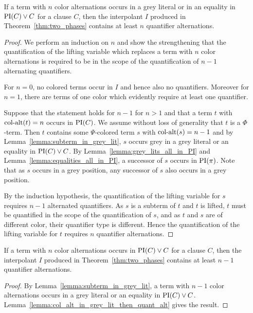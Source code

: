 \documentclass[%
	draft=false,%
	numbers=noendperiod,%
	11pt,%
	a4paper,%
	oneside,%
	openany,%
]{memoir}
\begin{document}
\begin{lemma}
	\label{lemma:col_alt_in_grey_lit_then_quant_alt}
	If a term with $n$ color alternations occurs in a grey literal or in an equality in $\operatorname{PI}(C) \lor C$ for a clause $C$, then the interpolant $I$ produced in Theorem~\ref{thm:two_phases} contains at least $n$ quantifier alternations.
\end{lemma}
\begin{proof}
	We perform an induction on $n$
	and show the strengthening that
	the quantification of the lifting variable which replaces a term with $n$ color alternations is required to be in the scope of the quantification of $n-1$ alternating quantifiers.

	For $n=0$, no colored terms occur in $I$ and hence also no quantifiers.
	Moreover for $n=1$, there are terms of one color which evidently require at least one quantifier.

	Suppose that the statement holds for $n-1$ for $n>1$ and that a term $t$ with $\operatorname{col-alt}(t) = n$ occurs in $\operatorname{PI}(C)$.
	We assume without loss of generality that $t$ is a $\Phi$-term.
	Then $t$ contains some $\Psi$-colored term $s$ with $\operatorname{col-alt}(s) = n-1$ and
	by Lemma~\ref{lemma:subterm_in_grey_lit}, $s$ occurs grey in a grey literal or an equality in $\operatorname{PI}(C) \lor C$.
	By Lemma~\ref{lemma:grey_lits_all_in_PI} and Lemma~\ref{lemma:equalities_all_in_PI}, a successor of $s$ occurs in $\operatorname{PI}(\pi)$. Note that as $s$ occurs in a grey position, any successor of $s$ also occurs in a grey position.

	By the induction hypothesis, the quantification of the lifting variable for $s$ requires $n-1$ alternated quantifiers.
	As $s$ is a subterm of $t$ and $t$ is lifted, $t$ must be quantified in the scope of the quantification of $s$, and as $t$ and $s$ are of different color, their quantifier type is different. 
	Hence the quantification of the lifting variable for $t$ requires $n$ quantifier alternations.
\end{proof}

\begin{prop}
	\label{prop:color_alt_eq_quant_alt}
	If a term with $n$ color alternations occurs in $\operatorname{PI}(C) \lor C$ for a clause $C$, then the interpolant $I$ produced in Theorem~\ref{thm:two_phases} contains at least $n-1$ quantifier alternations.
\end{prop}
\begin{proof}
	By Lemma~\ref{lemma:subterm_in_grey_lit}, a term with $n-1$ color alternations occurs in a grey literal or an equality in $\operatorname{PI}(C) \lor C$.
	Lemma~\ref{lemma:col_alt_in_grey_lit_then_quant_alt} gives the result.
\end{proof}
\end{document}
